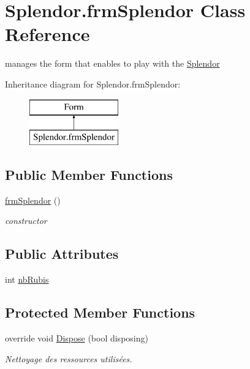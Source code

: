 \hypertarget{class_splendor_1_1frm_splendor}{}\section{Splendor.\+frm\+Splendor Class Reference}
\label{class_splendor_1_1frm_splendor}


manages the form that enables to play with the \hyperlink{namespace_splendor}{Splendor}  


Inheritance diagram for Splendor.\+frm\+Splendor\+:\begin{figure}[H]
\begin{center}
\leavevmode
\includegraphics[height=2.000000cm]{class_splendor_1_1frm_splendor}
\end{center}
\end{figure}
\subsection*{Public Member Functions}
\begin{DoxyCompactItemize}
\item 
\hyperlink{class_splendor_1_1frm_splendor_ad9c938893d23192acb1996053e3ea87b}{frm\+Splendor} ()
\begin{DoxyCompactList}\small\item\em constructor \end{DoxyCompactList}\end{DoxyCompactItemize}
\subsection*{Public Attributes}
\begin{DoxyCompactItemize}
\item 
int \hyperlink{class_splendor_1_1frm_splendor_a25670906523e1c2baec04410ed142d7c}{nb\+Rubis}
\end{DoxyCompactItemize}
\subsection*{Protected Member Functions}
\begin{DoxyCompactItemize}
\item 
override void \hyperlink{class_splendor_1_1frm_splendor_a749f4f1d67c78e74aa1a55aa6fdd754b}{Dispose} (bool disposing)
\begin{DoxyCompactList}\small\item\em Nettoyage des ressources utilisées. \end{DoxyCompactList}\end{DoxyCompactItemize}


